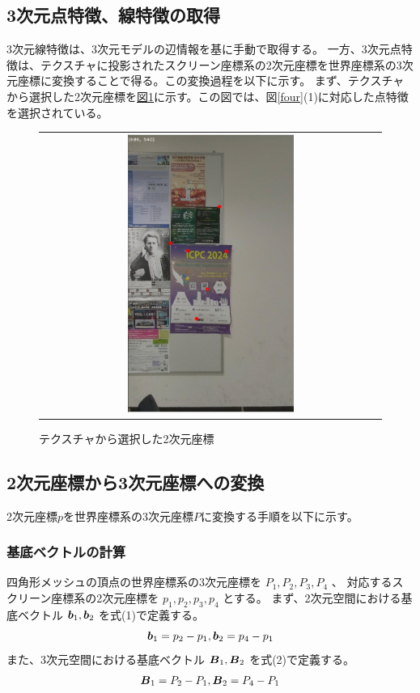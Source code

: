 \documentclass[]{jarticle}          %
\begin{document}
\subsection{3次元点特徴、線特徴の取得}
3次元線特徴は、3次元モデルの辺情報を基に手動で取得する。
一方、3次元点特徴は、テクスチャに投影されたスクリーン座標系の2次元座標を世界座標系の3次元座標に変換することで得る。この変換過程を以下に示す。
まず、テクスチャから選択した2次元座標を\hyperref[five]{図\ref{five}}に示す。この図では、図\ref{four}(1)に対応した点特徴を選択されている。
\begin{figure}[H]
  \begin{center}
    \begin{tabular}{c}
      \includegraphics[width=0.5\textwidth]{figures/points_texture.png}\\
    \end{tabular}
  \end{center}
  \caption{テクスチャから選択した2次元座標}
  \label{five}
\end{figure}

\subsection{2次元座標から3次元座標への変換}
2次元座標$p$を世界座標系の3次元座標$P$に変換する手順を以下に示す。
\subsubsection{基底ベクトルの計算}
四角形メッシュの頂点の世界座標系の3次元座標を $P_1,P_2,P_3,P_4$ 、
対応するスクリーン座標系の2次元座標を $p_1,p_2,p_3,p_4$ とする。
まず、2次元空間における基底ベクトル $\mbox{\boldmath $b$}_1,\mbox{\boldmath $b$}_2$ を式(1)で定義する。
\begin{equation}
  \mbox{\boldmath $b$}_1 = p_2 - p_1,
  \mbox{\boldmath $b$}_2 = p_4 - p_1
\end{equation}
また、3次元空間における基底ベクトル $\mbox{\boldmath $B$}_1,\mbox{\boldmath $B$}_2$ を式(2)で定義する。
\begin{equation}
  \mbox{\boldmath $B$}_1 = P_2 - P_1,
  \mbox{\boldmath $B$}_2 = P_4 - P_1
\end{equation}
\end{document}
